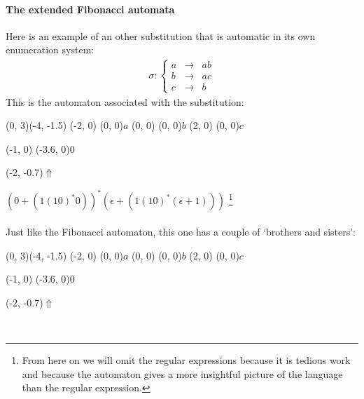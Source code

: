 \documentclass{article}
\begin{document}
\paragraph{The extended Fibonacci automata}
Here is an example of an other substitution that is automatic in its own
enumeration system:
\begin{eqnarray*}
\sigma: \left\{ \begin{array}{lll}
a &\rightarrow& ab\\
b &\rightarrow& ac\\
c &\rightarrow& b
\end{array} \right.
\end{eqnarray*}
This is the automaton associated with the substitution:\\
\begin{graph}(0, 3)(-4, -1.5)
  (-2, 0) (0, 0){$a$}
  (0, 0)  (0, 0){$b$}
  (2, 0)  (0, 0){$c$}

  (-1, 0) \freetext(-3.6, 0){0}
   
   
   
   

  \freetext(-2, -0.7){$\Uparrow$}
\end{graph} $(0 + (1 (10)^* 0))^* (\epsilon + (1 (10)^* (\epsilon + 1)))$
\footnote{From here on we will omit the regular expressions because it is 
tedious work and because the automaton gives a more insightful picture of the
language than the regular expression.}\\
\\
Just like the Fibonacci automaton, this one has a couple of `brothers and 
sisters':\\
\begin{graph}(0, 3)(-4, -1.5)
  (-2, 0) (0, 0){$a$}
  (0, 0)  (0, 0){$b$}
  (2, 0)  (0, 0){$c$}

  (-1, 0) \freetext(-3.6, 0){0}
   
   
   
   

  \freetext(-2, -0.7){$\Uparrow$}
\end{graph}\\
\end{document}

